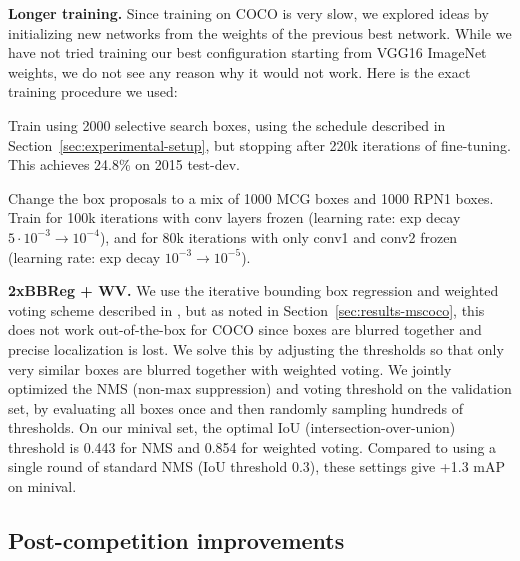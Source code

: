 \documentclass[10pt,twocolumn,letterpaper]{article}
\begin{document}
\begin{packed_enum}
%
  \item \textbf{Longer training.}  Since training on COCO is very slow, we
  explored ideas by initializing new networks from the weights of the previous
  best network.  While we have not tried training our best configuration
  starting from VGG16 ImageNet weights, we do not see any reason why it would not
  work.  Here is the exact training procedure we used:
  \begin{packed_enum}
    \item Train using 2000 selective search boxes, using the schedule described
      in Section~\ref{sec:experimental-setup}, but stopping after 220k iterations
      of fine-tuning.  This achieves 24.8\% on 2015 test-dev.
    \item Change the box proposals to a mix of 1000 MCG boxes and 1000 RPN1
      boxes.  Train for 100k iterations with conv layers frozen (learning rate: exp decay
      $5 \cdot 10^{-3} \rightarrow 10^{-4}$), and for 80k iterations with
      only conv1 and conv2 frozen (learning rate: exp decay $10^{-3} \rightarrow 10^{-5}$).
  \end{packed_enum}
%
  \item \textbf{2xBBReg + WV.}  We use the iterative bounding box regression and
    weighted voting scheme described in \cite{MR-CNN}, but as noted in
    Section~\ref{sec:results-mscoco}, this does not work out-of-the-box for COCO
    since boxes are blurred together and precise localization is lost.  We solve
    this by adjusting the thresholds so that only very similar boxes are blurred
    together with weighted voting.  We jointly optimized the NMS (non-max
    suppression) and voting threshold on the validation set, by evaluating all
    boxes once and then randomly sampling hundreds of thresholds.  On our
    minival set, the optimal IoU (intersection-over-union) threshold is 0.443
    for NMS and 0.854 for weighted voting.  Compared to using a single round of
    standard NMS (IoU threshold 0.3), these settings give +1.3 mAP on minival.
%
%
\end{packed_enum}\subsection*{Post-competition improvements}
\end{document}
